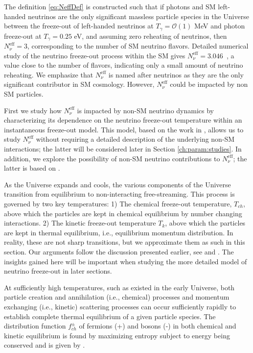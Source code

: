 The definition \eqref{eq:NeffDef} is constructed such that if photons and SM left-handed neutrinos are the only significant massless particle species in the Universe between the freeze-out of left-handed neutrinos at $T_\gamma=\mathcal{O}(1)$ MeV and photon freeze-out at $T_\gamma=0.25$ eV, and assuming zero reheating of neutrinos, then $N^{\text{eff}}_{\nu}=3$, corresponding to the number of SM neutrino flavors. Detailed numerical study of the neutrino freeze-out process within the SM gives $N^{\text{eff}}_{\nu}=3.046$~\cite{Mangano:2005cc}, a value close to the number of flavors, indicating only a small amount of neutrino reheating. 
 We emphasize that $N^{\text{eff}}_\nu$ is named after neutrinos as they are the only significant contributor in SM cosmology. However, $N^{\text{eff}}_\nu$ could be impacted by non SM particles.

First we study how $N^{\text{eff}}_{\nu}$ is impacted by non-SM neutrino dynamics by characterizing its dependence on the neutrino freeze-out temperature within an instantaneous freeze-out model. This model, based on the work in \cite{Birrell:2013gpa,Birrell:2012gg}, allows us to study $N^{\text{eff}}_{\nu}$ without requiring a detailed description of the underlying non-SM interactions; the latter will be considered later in Section \ref{ch:param:studies}. In addition, we explore the possibility of non-SM neutrino contributions to $N^{\text{eff}}_\nu$; the latter is based on \cite{Birrell:2014cja}.


As the Universe expands and cools, the various components of the Universe transition from equilibrium to non-interacting free-streaming. This process is governed by two key temperatures: 1) The chemical freeze-out temperature, $T_{ch}$, above which the particles are kept in chemical equilibrium by number changing interactions. 2) The kinetic freeze-out temperature $T_k$, above which the particles are kept in thermal equilibrium, i.e., equilibrium momentum distribution. In reality, these are not sharp transitions, but we approximate them as such in this section.  Our arguments follow the discussion presented earlier, see  and . The insights gained here will be important when studying the more detailed model of neutrino freeze-out in later sections.

At sufficiently high temperatures, such as existed in the early Universe, both particle creation and annihilation (i.e., chemical) processes and momentum exchanging (i.e., kinetic) scattering processes can occur sufficiently rapidly to establish complete thermal equilibrium of a given particle species. The distribution function $f_{ch}^\pm$ of fermions (+) and bosons (-) in both chemical and kinetic equilibrium is found by maximizing entropy subject to energy being conserved and is given by .
 
